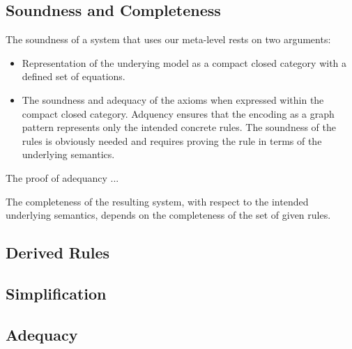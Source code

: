 \documentclass[runningheads]{llncs}
\begin{document}
\subsection{Soundness and Completeness} 

The soundness of a system that uses our meta-level rests on two
arguments: 

\begin{itemize}
\item Representation of the underying model as a compact closed
  category with a defined set of equations.

\item The soundness and adequacy of the axioms when expressed within
  the compact closed category. Adquency ensures that the encoding as a
  graph pattern represents only the intended concrete rules. The
  soundness of the rules is obviously needed and requires proving the
  rule in terms of the underlying semantics.
\end{itemize}

The proof of adequancy ...

The completeness of the resulting system, with respect to the intended
underlying semantics, depends on the completeness of the set of given
rules.

\subsection{Derived Rules}


\subsection{Simplification}


\subsection{Adequacy}







\end{document}
